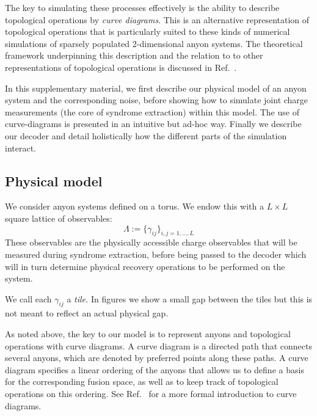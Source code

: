 \documentclass[aps, letterpaper, onecolumn, superscriptaddress, notitlepage, 10pt]{revtex4-1}
\begin{document}
The key to simulating these processes effectively is the ability to describe topological operations by \emph{curve diagrams}. This is an alternative representation of topological operations that is particularly suited to these kinds of numerical simulations of sparsely populated 2-dimensional anyon systems. The theoretical framework underpinning this description and the relation to to other representations of topological operations is discussed in Ref.~\cite{CurveDiagrams}.

In this supplementary material, we first describe our physical model of an anyon system and the corresponding noise, before showing how to simulate joint charge measurements (the core of syndrome extraction) within this model. The use of curve-diagrams is presented in an intuitive but ad-hoc way. Finally we describe our decoder and detail holistically how the different parts of the simulation interact.


\subsection{Physical model}

We consider anyon systems defined on a torus.
We endow this with a $L\times L$ square lattice of observables:
$$
    \Lambda := \bigl\{ \gamma_{ij} \bigr\}_{i,j=1,...,L}
$$
These observables are the physically accessible charge observables that will be measured during syndrome extraction, before being passed to the decoder which will in turn determine physical recovery operations to be performed on the system.

We call each $\gamma_{ij}$ a \emph{tile.}
In figures we show a small gap between the tiles but this is not meant
to reflect an actual physical gap.

As noted above, the key to our model is to represent anyons and topological operations with curve diagrams. A curve diagram is a directed path that connects several anyons, which are denoted by preferred points along these paths. A curve diagram specifies a linear ordering of the anyons that allows us to define a basis for the corresponding fusion space, as well as to keep track of topological operations on this ordering. See Ref.~\cite{CurveDiagrams} for a more formal introduction to curve diagrams.

\end{document}

